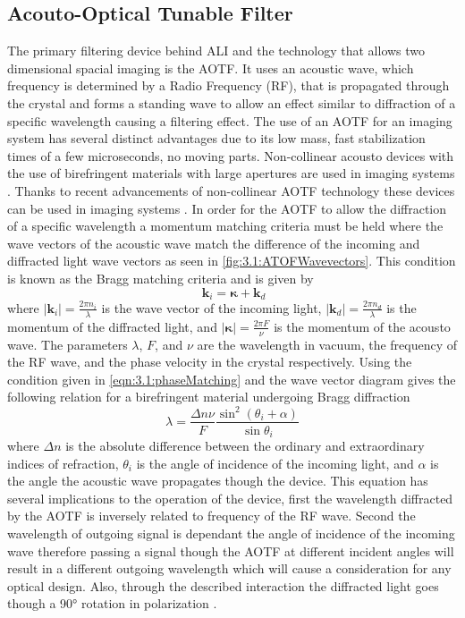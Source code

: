 \documentclass[12pt]{article}
\begin{document}
\subsection{Acouto-Optical Tunable Filter}

The primary filtering device behind ALI and the technology that allows two dimensional spacial imaging is the AOTF. It uses an acoustic wave, which frequency is determined by a Radio Frequency (RF), that is propagated through the crystal and forms a standing wave to allow an effect similar to diffraction of a specific wavelength causing a filtering effect. The use of an AOTF for an imaging system has several distinct advantages due to its low mass, fast stabilization times of a few microseconds, no moving parts. Non-collinear acousto devices with the use of birefringent materials with large apertures are used in imaging systems \citep{Chang1974}. Thanks to recent advancements of non-collinear AOTF technology these devices can be used in imaging systems \citep{Georgiev2002, Voloshinov2007}. In order for the AOTF to allow the diffraction of a specific wavelength a momentum matching criteria must be held where the wave vectors of the acoustic wave match the difference of the incoming and diffracted light wave vectors as seen in \autoref{fig:3.1:ATOFWavevectors}. This condition is known as the Bragg matching criteria and is given by
\begin{equation}
    \ \mathbf{k}_{i} = \boldsymbol\kappa + \mathbf{k}_{d}
    \label{eqn:3.1:phaseMatching}
\end{equation}
where $\left|\mathbf{k}_{i}\right| = \frac{2\pi n_{i}}{\lambda}$ is the wave vector of the incoming light, $\left|\mathbf{k}_{d}\right| = \frac{2\pi n_{d}}{\lambda}$ is the momentum of the diffracted light, and $\left|\boldsymbol\kappa\right| = \frac{2\pi F}{\nu}$ is the momentum of the acousto wave. The parameters $\lambda$, $F$, and $\nu$ are the wavelength in vacuum, the frequency of the RF wave, and the phase velocity in the crystal respectively. Using the condition given in \autoref{eqn:3.1:phaseMatching} and the wave vector diagram gives the following relation for a birefringent material undergoing Bragg diffraction
\begin{equation}
    \lambda  = \frac{\Delta n\nu}{F}\frac{\sin^{2}(\theta_{i}+\alpha)}{\sin\theta_{i}}
    \label{eqn:3.1:AOTFWavelengthDependance}
\end{equation}
where $\Delta n$ is the absolute difference between the ordinary and extraordinary indices of refraction, $\theta_{i}$ is the angle of incidence of the incoming light, and $\alpha$ is the angle the acoustic wave propagates though the device. This equation has several implications to the operation of the device, first the wavelength diffracted by the AOTF is inversely related to frequency of the RF wave. Second the wavelength of outgoing signal is dependant the angle of incidence of the incoming wave therefore passing a signal though the AOTF at different incident angles will result in a different outgoing wavelength which will cause a consideration for any optical design. Also, through the described interaction the diffracted light goes though a 90\si{\degree} rotation in polarization \citep{Voloshinov1996}.
\end{document}
